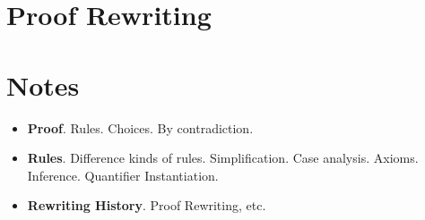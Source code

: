 \section{Proof Rewriting}

\section{Notes}
\begin{itemize}
\item {\bf Proof}.  Rules.  Choices.  By contradiction.
\item {\bf Rules}.  Difference kinds of rules.  Simplification.  Case analysis.  Axioms.  Inference.  Quantifier Instantiation.
\item {\bf Rewriting History}.  Proof Rewriting, etc.
\end{itemize}